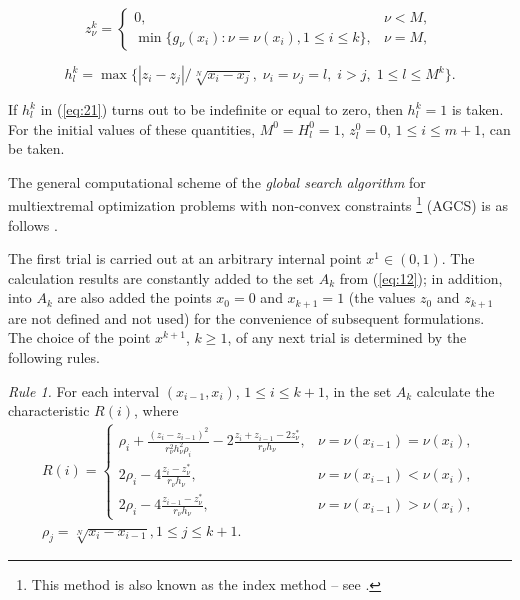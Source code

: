 \documentclass[smallextended]{svjour3}       %
\begin{document}
\begin{equation}\label{eq:20}
z^k_\nu = 
 \begin{cases}
   0, & \nu < M, \\
   \min{\{g_\nu(x_i):\nu=\nu(x_i), 1\leq i \leq k \}}, & \nu = M,
 \end{cases}
\end{equation}

\begin{equation}\label{eq:21}
h^k_l=\max{\{|z_i-z_j|/\sqrt[N]{x_i-x_j},\; \nu_i=\nu_j=l,\; i>j, \;1\leq l\leq M^k\}}.
\end{equation}

If $h_l^k$ in (\ref{eq:21}) turns out to be indefinite or equal to zero, then $h_l^k=1$ is taken. For the initial values of these quantities, $M^0 = H_l^0=1$, $z_l^0=0$, $1 \leq i \leq m+1$, can be taken.

The general computational scheme of the \textit{global search algorithm} for multiextremal optimization problems with non-convex constraints \footnote{This method is also known as the index method -- see \cite{c18}.} (AGCS) is as follows \cite{c18}.

The first trial is carried out at an arbitrary internal point $x^1\in (0,1)$. The calculation results are constantly added to the set $A_k$ from (\ref{eq:12}); in addition, into $A_k$ are also added the points $x_0=0$ and $x_{k+1}=1$ (the values $z_0$ and $z_{k+1}$ are not defined and not used) for the convenience of subsequent formulations. The choice of the point $x^{k+1}$, $k\geq 1$, of any next trial is determined by the following rules.

\textit{Rule 1.} For each interval $(x_{i-1},x_i)$, $1 \leq i \leq k+1$, in the set $A_k$ calculate the characteristic $R(i)$, where
\begin{equation}\label{eq:22}
\begin{matrix}
R(i) = 
 \begin{cases}
   \rho_i + \frac{(z_i-z_{i-1})^2}{r^2_\nu h^2_\nu \rho_i} - 2 \frac{z_i+z_{i-1}-2z^*_\nu}{r_\nu h_\nu}, & \nu=\nu(x_{i-1})=\nu(x_i), \\
   2 \rho_i - 4\frac{z_i-z^*_\nu}{r_\nu h_\nu}, & \nu=\nu(x_{i-1})<\nu(x_i), \\
2 \rho_i - 4\frac{z_{i-1}-z^*_\nu}{r_\nu h_\nu}, & \nu=\nu(x_{i-1})>\nu(x_i), 
 \end{cases} \\
\rho_j = \sqrt[N]{x_i-x_{i-1}}, 1\leq j\leq k+1.
\end{matrix}
\end{equation}
\end{document}
